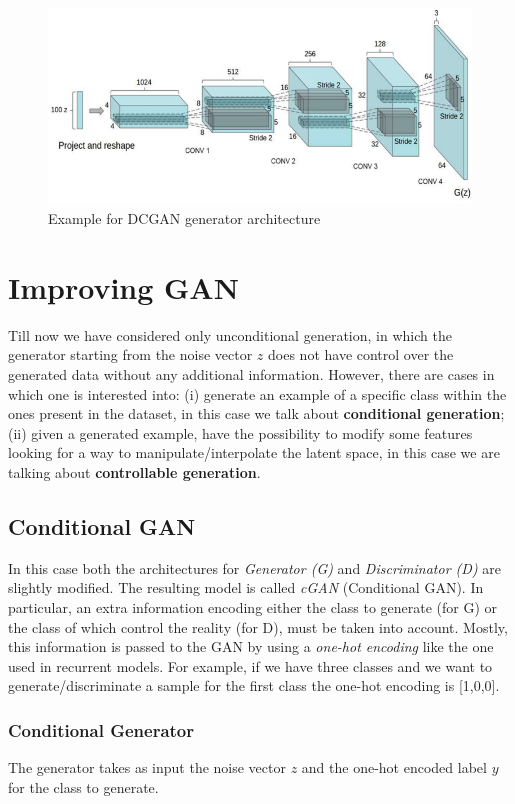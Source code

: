 \begin{figure}
    \centering
    \includegraphics[scale=0.6]{img/DCGAN_generator.png}
    \caption{Example for DCGAN generator architecture}
\end{figure}

\section{Improving GAN}
Till now we have considered only unconditional generation, in which the generator starting from the noise vector $z$ does not have control over the generated data without any additional information.
However, there are cases in which one is interested into: (i) generate an example of a specific class within the ones present in the dataset, in this case we talk about \textbf{conditional generation}; (ii) given a generated example, have the possibility to modify some features looking for a way to manipulate/interpolate the latent space, in this case we are talking about \textbf{controllable generation}.

\subsection{Conditional GAN}
In this case both the architectures for \textit{Generator (G)} and \textit{Discriminator (D)} are slightly modified. The resulting model is called \textit{cGAN} (Conditional GAN). In particular, an extra information encoding either the class to generate (for G) or the class of which control the reality (for D), must be taken into account. Mostly, this information is passed to the GAN by using a \textit{one-hot encoding} like the one used in recurrent models. For example, if we have three classes and we want to generate/discriminate a sample for the first class the one-hot encoding is [1,0,0].

\subsubsection{Conditional Generator}
The generator takes as input the noise vector $z$ and the one-hot encoded label $y$ for the class to generate. 

